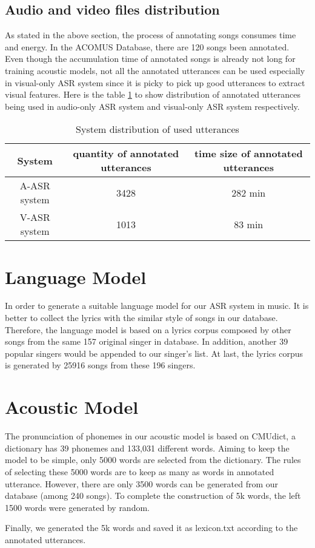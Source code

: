 \subsection{Audio and video files distribution}
As stated in the above section, the process of annotating songs consumes time and energy. In the ACOMUS Database, there are 120 songs been annotated. Even though the accumulation time of annotated songs is already not long for training acoustic models, not all the annotated utterances can be used especially in visual-only ASR system since it is picky to pick up good utterances to extract visual features. Here is the table \ref{tab:utterance} to show distribution of annotated utterances being used in audio-only ASR system and visual-only ASR system respectively.
\begin{table}[ht]
\center
\begin{tabular}{c|cc}
System & quantity of annotated utterances & time size of annotated utterances\\
\hline
A-ASR system & 3428 & 282 min\\
V-ASR system & 1013 & 83 min\\

\end{tabular}
\caption{System distribution of used utterances}
\label{tab:utterance}
\end{table}



\section{Language Model}
In order to generate a suitable language model for our ASR system in music. It is better to collect the lyrics with the similar style of songs in our database. 
Therefore, the language model is based on a lyrics corpus composed by other songs from the same 157 original singer in database. In addition, another 39 popular singers would be appended to our singer's list. At last, the lyrics corpus is generated by 25916 songs from these 196 singers.

\section{Acoustic Model}

The pronunciation of phonemes in our acoustic model is based on CMUdict, a dictionary has 39 phonemes and 133,031 different words. Aiming to keep the model to be simple, only 5000 words are selected from the dictionary. The rules of selecting these 5000 words are to keep as many as words in annotated utterance. However, there are only 3500 words can be generated from our database (among 240 songs). To complete the construction of 5k words, the left 1500 words were generated by random.

Finally, we generated the 5k words and saved it as lexicon.txt according to the annotated utterances.

